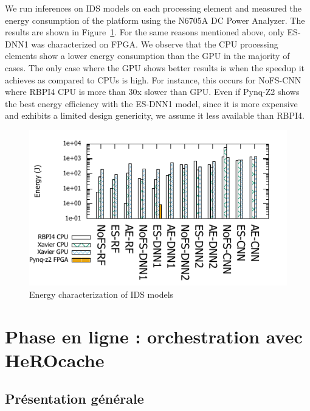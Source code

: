 We run inferences on IDS models on each processing element and measured the energy consumption of the platform using the N6705A DC Power Analyzer. The results are shown in Figure~\ref{figure:herocache-energy}. For the same reasons mentioned above, only ES-DNN1 was characterized on FPGA. %
We observe that the CPU processing elements show a lower energy consumption than the GPU in the majority of cases. The only case where the GPU shows better results is when the speedup it achieves as compared to CPUs is high. For instance, this occurs for NoFS-CNN where RBPI4 CPU is more than 30x slower than GPU.  
Even if Pynq-Z2 shows the best energy efficiency with the ES-DNN1 model, since it is more expensive and exhibits a limited design genericity, we assume it less available than RBPI4.

\begin{figure}
    \centering
    \includegraphics[width=0.9\columnwidth]{6_Chapitre4/figures/energy_bar.pdf}
    \caption{Energy characterization of IDS models}
    \label{figure:herocache-energy}
\end{figure}

\section{Phase en ligne : orchestration avec HeROcache} \label{section:herocache-contribution}

\subsection{Présentation générale}

